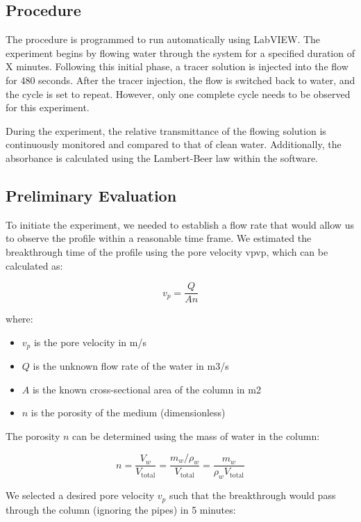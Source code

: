 \subsection{Procedure}
The procedure is programmed to run automatically using LabVIEW. 
The experiment begins by flowing water through the system for a specified duration of X minutes. 
Following this initial phase, a tracer solution is injected into the flow for 480 seconds. 
After the tracer injection, the flow is switched back to water, and the cycle is set to repeat. 
However, only one complete cycle needs to be observed for this experiment.

During the experiment, the relative transmittance of the flowing solution is continuously monitored and compared to that of clean water.
Additionally, the absorbance is calculated using the Lambert-Beer law within the software.

\subsection{Preliminary Evaluation}
To initiate the experiment, we needed to establish a flow rate that would allow us to observe the profile within a reasonable time frame. We estimated the breakthrough time of the profile using the pore velocity vpvp​, which can be calculated as:

\begin{equation}
v_p = \frac{Q}{An}
\end{equation}

where:
\begin{itemize}
    \item $v_p$ is the pore velocity in m/s
    \item $Q$ is the unknown flow rate of the water in m3/s
    \item $A$ is the known cross-sectional area of the column in m2
    \item $n$ is the porosity of the medium (dimensionless)
\end{itemize}

The porosity $n$ can be determined using the mass of water in the column:

\begin{equation}
n = \frac{V_w}{V_{\text{total}}} = \frac{m_w/\rho_w}{V_{\text{total}}} = \frac{m_w}{\rho_w V_{\text{total}}}
\end{equation}

We selected a desired pore velocity $v_p$ such that the breakthrough would pass through the column (ignoring the pipes) in 5 minutes:

